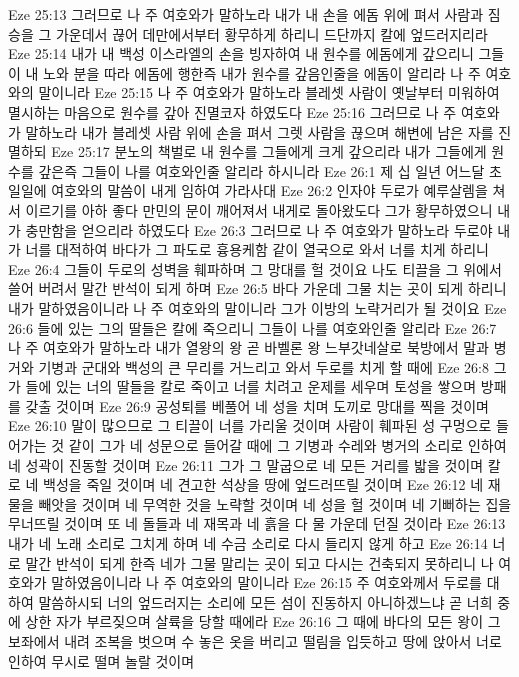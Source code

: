 Eze 25:13  그러므로 나 주 여호와가 말하노라 내가 내 손을 에돔 위에 펴서 사람과 짐승을 그 가운데서 끊어 데만에서부터 황무하게 하리니 드단까지 칼에 엎드러지리라
Eze 25:14  내가 내 백성 이스라엘의 손을 빙자하여 내 원수를 에돔에게 갚으리니 그들이 내 노와 분을 따라 에돔에 행한즉 내가 원수를 갚음인줄을 에돔이 알리라 나 주 여호와의 말이니라
Eze 25:15  나 주 여호와가 말하노라 블레셋 사람이 옛날부터 미워하여 멸시하는 마음으로 원수를 갚아 진멸코자 하였도다
Eze 25:16  그러므로 나 주 여호와가 말하노라 내가 블레셋 사람 위에 손을 펴서 그렛 사람을 끊으며 해변에 남은 자를 진멸하되
Eze 25:17  분노의 책벌로 내 원수를 그들에게 크게 갚으리라 내가 그들에게 원수를 갚은즉 그들이 나를 여호와인줄 알리라 하시니라
Eze 26:1  제 십 일년 어느달 초 일일에 여호와의 말씀이 내게 임하여 가라사대
Eze 26:2  인자야 두로가 예루살렘을 쳐서 이르기를 아하 좋다 만민의 문이 깨어져서 내게로 돌아왔도다 그가 황무하였으니 내가 충만함을 얻으리라 하였도다
Eze 26:3  그러므로 나 주 여호와가 말하노라 두로야 내가 너를 대적하여 바다가 그 파도로 흉용케함 같이 열국으로 와서 너를 치게 하리니
Eze 26:4  그들이 두로의 성벽을 훼파하며 그 망대를 헐 것이요 나도 티끌을 그 위에서 쓸어 버려서 말간 반석이 되게 하며
Eze 26:5  바다 가운데 그물 치는 곳이 되게 하리니 내가 말하였음이니라 나 주 여호와의 말이니라 그가 이방의 노략거리가 될 것이요
Eze 26:6  들에 있는 그의 딸들은 칼에 죽으리니 그들이 나를 여호와인줄 알리라
Eze 26:7  나 주 여호와가 말하노라 내가 열왕의 왕 곧 바벨론 왕 느부갓네살로 북방에서 말과 병거와 기병과 군대와 백성의 큰 무리를 거느리고 와서 두로를 치게 할 때에
Eze 26:8  그가 들에 있는 너의 딸들을 칼로 죽이고 너를 치려고 운제를 세우며 토성을 쌓으며 방패를 갖출 것이며
Eze 26:9  공성퇴를 베풀어 네 성을 치며 도끼로 망대를 찍을 것이며
Eze 26:10  말이 많으므로 그 티끌이 너를 가리울 것이며 사람이 훼파된 성 구멍으로 들어가는 것 같이 그가 네 성문으로 들어갈 때에 그 기병과 수레와 병거의 소리로 인하여 네 성곽이 진동할 것이며
Eze 26:11  그가 그 말굽으로 네 모든 거리를 밟을 것이며 칼로 네 백성을 죽일 것이며 네 견고한 석상을 땅에 엎드러뜨릴 것이며
Eze 26:12  네 재물을 빼앗을 것이며 네 무역한 것을 노략할 것이며 네 성을 헐 것이며 네 기뻐하는 집을 무너뜨릴 것이며 또 네 돌들과 네 재목과 네 흙을 다 물 가운데 던질 것이라
Eze 26:13  내가 네 노래 소리로 그치게 하며 네 수금 소리로 다시 들리지 않게 하고
Eze 26:14  너로 말간 반석이 되게 한즉 네가 그물 말리는 곳이 되고 다시는 건축되지 못하리니 나 여호와가 말하였음이니라 나 주 여호와의 말이니라
Eze 26:15  주 여호와께서 두로를 대하여 말씀하시되 너의 엎드러지는 소리에 모든 섬이 진동하지 아니하겠느냐 곧 너희 중에 상한 자가 부르짖으며 살륙을 당할 때에라
Eze 26:16  그 때에 바다의 모든 왕이 그 보좌에서 내려 조복을 벗으며 수 놓은 옷을 버리고 떨림을 입듯하고 땅에 앉아서 너로 인하여 무시로 떨며 놀랄 것이며
